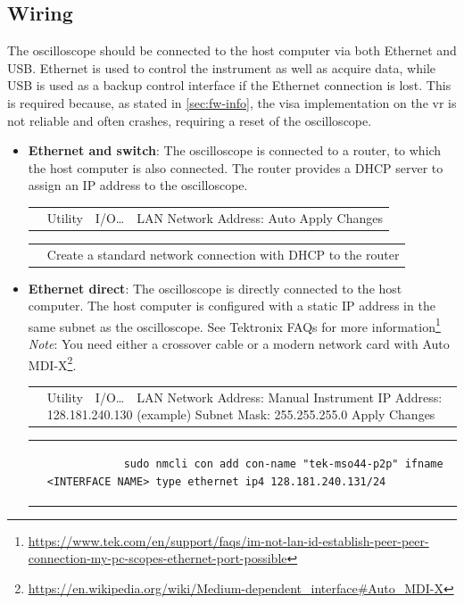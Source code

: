 \documentclass[a4paper,english,twoside,10pt]{article}
\newenvironment{scopesetting}{
	\parskip=5pt\par\nopagebreak\centering\sffamily%
	\begin{tabular}{>{\columncolor{cyan!15}}m{2em} >{\columncolor{cyan!15}}m{.8\textwidth}}
	 & 
} {
	\\
	\end{tabular}
	\par\noindent\ignorespacesafterend%
}
\newenvironment{laptopsetting}{
	\parskip=5pt\par\nopagebreak\centering\sffamily%
	\begin{tabular}{>{\columncolor{red!15}}m{2em} >{\columncolor{red!15}}m{.8\textwidth}}
	 & 
} {
	\\
	\end{tabular}
	\par\noindent\ignorespacesafterend%
}
\begin{document}
\subsection{Wiring}
The oscilloscope should be connected to the host computer via both Ethernet and USB. Ethernet is used to control the instrument as well as acquire data, while USB is used as a backup control interface if the Ethernet connection is lost. This is required because, as stated in \ref{sec:fw-info}, the visa implementation on the \gls{vr} is not reliable and often crashes, requiring a reset of the oscilloscope.
\begin{itemize}
	\item \textbf{Ethernet and switch}: The oscilloscope is connected to a router, to which the host computer is also connected. The router provides a DHCP server to assign an IP address to the oscilloscope.
	\begin{scopesetting}
		Utility\ \rightarrow\  I/O\ldots\ \rightarrow\  LAN\newline
		Network Address: Auto\newline
		Apply Changes
	\end{scopesetting}
	\begin{laptopsetting}
		Create a standard network connection with DHCP to the router
	\end{laptopsetting}

	\item \textbf{Ethernet direct}: The oscilloscope is directly connected to the host computer. The host computer is configured with a static IP address in the same subnet as the oscilloscope. See Tektronix FAQs for more information\footnote{\url{https://www.tek.com/en/support/faqs/im-not-lan-id-establish-peer-peer-connection-my-pc-scopes-ethernet-port-possible}}\\
	\textit{Note}: You need either a crossover cable or a modern network card with Auto MDI-X\footnote{\url{https://en.wikipedia.org/wiki/Medium-dependent\_interface\#Auto\_MDI-X}}.
	\begin{scopesetting}
		Utility\ \rightarrow\  I/O\ldots\ \rightarrow\  LAN\newline
		Network Address: Manual\newline
		Instrument IP Address: 128.181.240.130 (example)\newline
		Subnet Mask: 255.255.255.0\newline
		Apply Changes
	\end{scopesetting}
	\begin{laptopsetting}
		\begin{verbatim}
			sudo nmcli con add con-name "tek-mso44-p2p" ifname <INTERFACE NAME> type ethernet ip4 128.181.240.131/24
		\end{verbatim}
	\end{laptopsetting}


\end{itemize}
\end{document}

